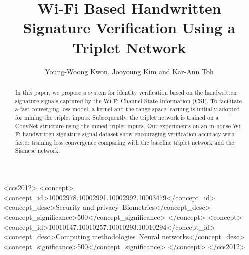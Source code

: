 \documentclass[sigconf]{acmart}
\begin{document}
\title{Wi-Fi Based Handwritten Signature Verification Using a Triplet Network}

\author{Young-Woong Kwon, Jooyoung Kim and Kar-Ann Toh}

\renewcommand{\shortauthors}{Y.Kwon, et al.}

\begin{abstract}
    In this paper, we propose a system for identity verification based on the handwritten signature signals captured by the Wi-Fi Channel State Information (CSI). 
    To facilitate a fast converging loss model, a kernel and the range space learning is initially adopted for mining the triplet inputs. 
    Subsequently, the triplet network is trained on a ConvNet structure using the mined triplet inputs. 
    Our experiments on an in-house Wi-Fi handwritten signature signal dataset show encouraging verification accuracy with faster training loss convergence comparing with the baseline triplet network and the Siamese network.
\end{abstract}


\begin{CCSXML}
    <ccs2012>
    <concept>
    <concept_id>10002978.10002991.10002992.10003479</concept_id>
    <concept_desc>Security and privacy~Biometrics</concept_desc>
    <concept_significance>500</concept_significance>
    </concept>
    <concept>   
    <concept_id>10010147.10010257.10010293.10010294</concept_id>
    <concept_desc>Computing methodologies~Neural networks</concept_desc>
    <concept_significance>500</concept_significance>
    </concept>
    </ccs2012>
\end{CCSXML}
    
\end{document}
